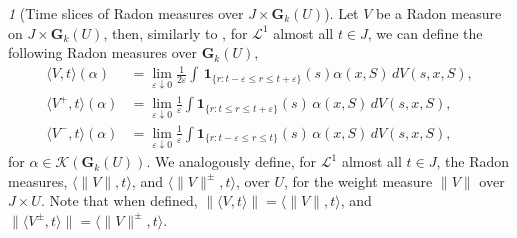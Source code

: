 \documentclass{article}
\theoremstyle{plain}
\theoremstyle{definition}
\theoremstyle{plain}
\theoremstyle{remark}
\newtheorem{propparagraph}[theorem]{}
\theoremstyle{remark}
\theoremstyle{plain}
\begin{document}
\begin{propparagraph}[Time slices of Radon measures over $J \times \mathbf{G}_{k} (U)$]
Let $V$ be a Radon measure on $J \times \mathbf{G}_{k} (U)$, then, similarly to \cite[3.4]{Menne-WDFV}, for $\mathscr{L}^{1}$ almost all $t \in J$, we can define the following Radon measures over $\mathbf{G}_{k} (U)$,
    \begin{equation*}
    \begin{split}
       \textstyle  \langle V, t \rangle (\alpha) &= \lim\limits_{\varepsilon \downarrow 0} \frac{1}{2 \varepsilon} \int \, \mathbf{1}_{\{ r \colon t - \varepsilon \leq r \leq t + \varepsilon \}} (s) \alpha (x, S) \, d V (s, x, S), \\ 
        \textstyle\langle V^{+}, t \rangle (\alpha) &= \lim\limits_{\varepsilon \downarrow 0} \frac{1}{\varepsilon} \int \mathbf{1}_{\{ r \colon t \leq r \leq t + \varepsilon \}} (s)  \, \alpha (x, S) \, d V (s, x, S), \\ 
        \textstyle\langle V^{-}, t \rangle (\alpha) &= \lim\limits_{\varepsilon \downarrow 0} \frac{1}{\varepsilon} \int \mathbf{1}_{\{ r \colon t - \varepsilon \leq r \leq t \}} (s) \, \alpha (x, S) \, d V (s, x, S),
    \end{split}
    \end{equation*}
for $\alpha \in \mathscr{K} (\mathbf{G}_{k} (U))$.
We analogously define, for $\mathscr{L}^{1}$ almost all $t \in J$, the Radon measures, $\langle \|V\|, t \rangle$, and $\langle \| V \|^{\pm}, t \rangle$, over $U$, for the weight measure $\|V\|$ over $J \times U$.
Note that when defined, $\| \langle V, t \rangle \| = \langle \| V \|, t \rangle$, and $\| \langle V^{\pm}, t \rangle \| = \langle \| V \|^{\pm}, t \rangle$.
\end{propparagraph}
\end{document}
